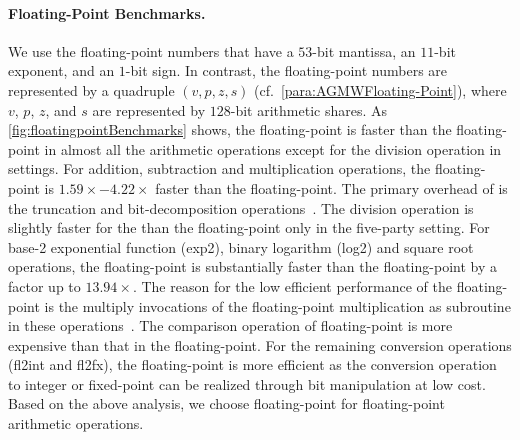 \paragraph{Floating-Point Benchmarks.}
\label{para:Floating-PointBenchmarking}
We use the \booleanGMW floating-point numbers that have a $53$-bit mantissa, an $11$-bit exponent, and an $1$-bit sign. In contrast, the \arithmeticGMW floating-point numbers are represented by a quadruple $\left(v, p, z, s\right) $ (cf.~\autoref{para:AGMWFloating-Point}), where $v$, $p$, $z$, and $s$ are represented by $128$-bit arithmetic shares. As \autoref{fig:floatingpointBenchmarks} shows, the \booleanGMW floating-point is faster than the \arithmeticGMW floating-point in almost all the arithmetic operations except for the division operation in \twopc settings. For addition, subtraction and multiplication operations, the \booleanGMW floating-point is $1.59\times-4.22\times$ faster than the \arithmeticGMW floating-point. The primary overhead of \arithmeticGMW is the truncation and bit-decomposition operations~\cite{aliasgari2012secure}. The division operation is slightly faster for the \arithmeticGMW than the \booleanGMW floating-point only in the five-party setting. For base-2 exponential function (exp2), binary logarithm (log2) and square root operations, the \booleanGMW floating-point is substantially faster than the \arithmeticGMW floating-point by a factor up to $13.94\times$. The reason for the low efficient performance of the \arithmeticGMW floating-point is the multiply invocations of the floating-point multiplication as subroutine in these operations~\cite{aliasgari2012secure}. The comparison operation of \arithmeticGMW floating-point is more expensive than that in the \booleanGMW floating-point. For the remaining conversion operations (fl2int and fl2fx), the \booleanGMW floating-point is more efficient as the conversion operation to integer or fixed-point can be realized through bit manipulation at low cost. Based on the above analysis, we choose \booleanGMW floating-point for floating-point arithmetic operations.



